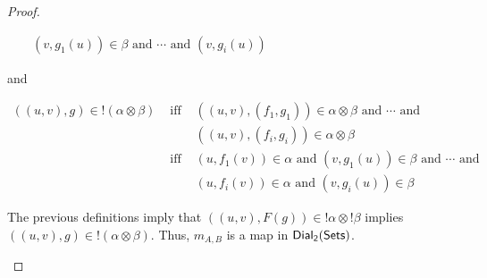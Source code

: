 \begin{proof}
\begin{report}
\begin{center}
\begin{itemize}
\begin{center}
\begin{math}
\begin{array}{lll}
            &              & (v,g_1(u)) \in \beta \text{ and } \cdots \text{ and } (v,g_i(u)) 
          \end{array}
        \end{math}
      \end{center}
      and
      \begin{center}
        \begin{math}
          \begin{array}{lll}
            ((u,v),g) \in !(\alpha \otimes \beta) 
            & \text{ iff } & ((u,v),(f_1,g_1)) \in \alpha \otimes \beta \text{ and } \cdots \text{ and } \\
            &              & ((u,v),(f_i,g_i)) \in \alpha \otimes \beta\\
            & \text{ iff } & (u,f_1(v)) \in \alpha \text{ and } (v,g_1(u)) \in \beta \text{ and } \cdots \text{ and } \\
            &              & (u,f_i(v)) \in \alpha \text{ and } (v,g_i(u)) \in \beta
          \end{array}
        \end{math}
      \end{center}
      The previous definitions imply that
      $((u,v),F(g)) \in !\alpha \otimes !\beta$ implies
      $((u,v),g) \in !(\alpha \otimes \beta)$.  Thus, $m_{A,B}$ is a map in $\mathsf{Dial_2}(\mathsf{Sets})$.
      

\end{itemize}
\end{center}
\end{report}
\end{proof}
